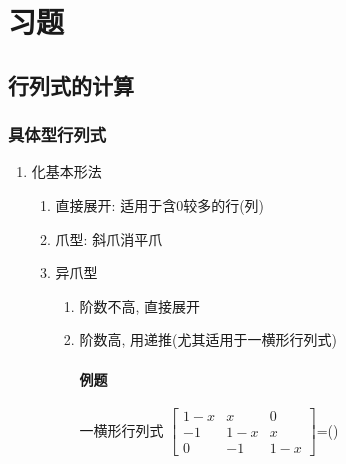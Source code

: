 \section{习题}
\subsection{行列式的计算}
\subsubsection{具体型行列式}
\begin{enumerate}
\item 化基本形法
\begin{enumerate}
\item 直接展开: 适用于含$ 0 $较多的行(列)
\item 爪型: 斜爪消平爪
\item 异爪型
\begin{enumerate}
\item 阶数不高, 直接展开
\item 阶数高, 用递推(尤其适用于一横形行列式)\par
\paragraph{例题} 一横形行列式
$\begin{bmatrix}
1-x & x & 0 \\
-1 & 1-x & x \\
0 & -1 & 1-x
\end{bmatrix}$=(\qquad)

\end{enumerate}
\end{enumerate}
\end{enumerate}
